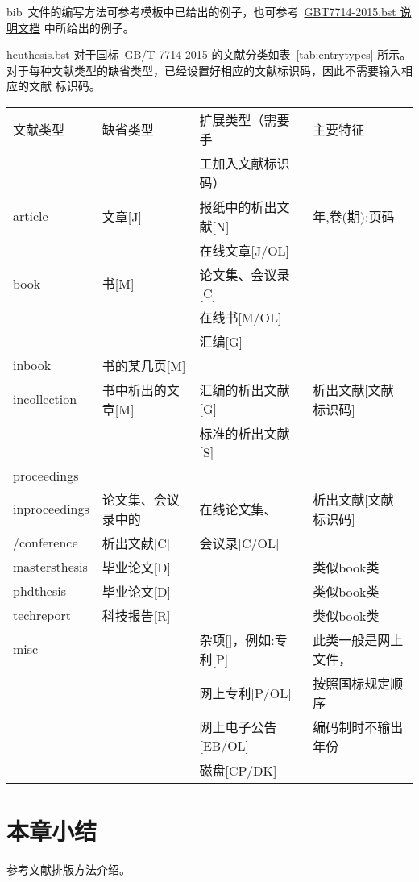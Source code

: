 bib~文件的编写方法可参考模板中已给出的例子，也可参考~\href{http://bbs.ctex.org/attachment.php?aid=MTk3OTd8NjY1ODc5OGV8MTMyNTY0MTEyMnxhZGZkYWpsa0I2RGZwNDR5Z1lyeStjb1dKRS8rTnJub3lvT2FkNDNJbHl1UWVkVQ\%3D\%3D}{GBT7714-2015.bst 说明文档} 中所给出的例子。


heuthesis.bst 对于国标~GB/T 7714-2015 的文献分类如表~\ref{tab:entrytypes} 所示。对于每种文献类型的缺省类型，已经设置好相应的文献标识码，因此不需要输入相应的文献
标识码。
\begin{table}[htbp]
\vspace{0.5em}\centering\wuhao
\begin{tabular}{llll}
\toprule[1.5pt]
文献类型 & 缺省类型 & 扩展类型（需要手 & 主要特征\\
 &  & 工加入文献标识码） & \\
\midrule[1pt]
article & 文章[J] & 报纸中的析出文献[N] & 年,卷(期):页码\\
 &  & 在线文章[J/OL] & \\
book & 书[M] & 论文集、会议录[C] & \\
 &  & 在线书[M/OL] & \\
 &  & 汇编[G] & \\
inbook & 书的某几页[M] &  & \\
incollection & 书中析出的文章[M] & 汇编的析出文献[G] & 析出文献[文献标识码]\\
 &  & 标准的析出文献[S] & \\
proceedings &  &  & \\
inproceedings & 论文集、会议录中的 & 在线论文集、 & 析出文献[文献标识码]\\
/conference & 析出文献[C] & 会议录[C/OL] & \\
mastersthesis & 毕业论文[D] &  & 类似book类\\
phdthesis & 毕业论文[D] &  & 类似book类\\
techreport & 科技报告[R] &  & 类似book类\\
misc &  & 杂项[]，例如:专利[P] & 此类一般是网上文件，\\
 &  & 网上专利[P/OL] & 按照国标规定顺序\\
 &  & 网上电子公告[EB/OL] & 编码制时不输出年份\\
 &  & 磁盘[CP/DK] & \\
\bottomrule[1.5pt]
\end{tabular}
\end{table}

\section*{本章小结}
参考文献排版方法介绍。
